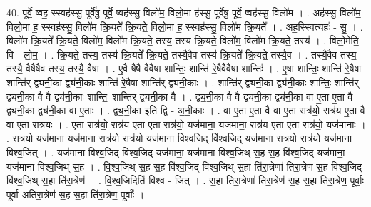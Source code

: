 \documentclass[17pt]{extarticle}
\begin{document}
40. पूर्वे॒ ष्वह॒ स्स्वह॑स्सु॒ पूर्वे॑षु॒ पूर्वे॒ ष्वह॑स्सु॒ विलो॑म॒ विलो॒मा ह॑स्सु॒ पूर्वे॑षु॒ पूर्वे॒ ष्वह॑स्सु॒ विलो॑म । . अह॑स्सु॒ विलो॑म॒ विलो॒मा ह॒ स्स्वह॑स्सु॒ विलो॑म क्रि॒यते᳚ क्रि॒यते॒ विलो॒मा ह॒ स्स्वह॑स्सु॒ विलो॑म क्रि॒यते᳚ । . अह॒स्स्वित्यहः॑ - सु॒ । . विलो॑म क्रि॒यते᳚ क्रि॒यते॒ विलो॑म॒ विलो॑म क्रि॒यते॒ तस्य॒ तस्य॑ क्रि॒यते॒ विलो॑म॒ विलो॑म क्रि॒यते॒ तस्य॑ । . विलो॒मेति॒ वि - लो॒म॒ । . क्रि॒यते॒ तस्य॒ तस्य॑ क्रि॒यते᳚ क्रि॒यते॒ तस्यै॒वैव तस्य॑ क्रि॒यते᳚ क्रि॒यते॒ तस्यै॒व । . तस्यै॒वैव तस्य॒ तस्यै॒ वैषैषैव तस्य॒ तस्यै॒ वैषा । . ए॒वै षैषै वैवैषा शान्तिः॒ शान्ति॑ रे॒षैवैवैषा शान्तिः॑ । . ए॒षा शान्तिः॒ शान्ति॑ रे॒षैषा शान्ति॑र् द्व्यनी॒का द्व्य॑नी॒काः शान्ति॑ रे॒षैषा शान्ति॑र् द्व्यनी॒काः । . शान्ति॑र् द्व्यनी॒का द्व्य॑नी॒काः शान्तिः॒ शान्ति॑र् द्व्यनी॒का वै वै द्व्य॑नी॒काः शान्तिः॒ शान्ति॑र् द्व्यनी॒का वै । . द्व्य॒नी॒का वै वै द्व्य॑नी॒का द्व्य॑नी॒का वा ए॒ता ए॒ता वै द्व्य॑नी॒का द्व्य॑नी॒का वा ए॒ताः । . द्व्य॒नी॒का इति॑ द्वि - अ॒नी॒काः । . वा ए॒ता ए॒ता वै वा ए॒ता रात्र॑यो॒ रात्र॑य ए॒ता वै वा ए॒ता रात्र॑यः । . ए॒ता रात्र॑यो॒ रात्र॑य ए॒ता ए॒ता रात्र॑यो॒ यज॑माना॒ यज॑माना॒ रात्र॑य ए॒ता ए॒ता रात्र॑यो॒ यज॑मानाः । . रात्र॑यो॒ यज॑माना॒ यज॑माना॒ रात्र॑यो॒ रात्र॑यो॒ यज॑माना विश्व॒जिद् वि॑श्व॒जिद् यज॑माना॒ रात्र॑यो॒ रात्र॑यो॒ यज॑माना विश्व॒जित् । . यज॑माना विश्व॒जिद् वि॑श्व॒जिद् यज॑माना॒ यज॑माना विश्व॒जिथ् स॒ह स॒ह वि॑श्व॒जिद् यज॑माना॒ यज॑माना विश्व॒जिथ् स॒ह । . वि॒श्व॒जिथ् स॒ह स॒ह वि॑श्व॒जिद् वि॑श्व॒जिथ् स॒हा ति॑रा॒त्रेणा॑ तिरा॒त्रेण॑ स॒ह वि॑श्व॒जिद् वि॑श्व॒जिथ् स॒हा ति॑रा॒त्रेण॑ । . वि॒श्व॒जिदिति॑ विश्व - जित् । . स॒हा ति॑रा॒त्रेणा॑ तिरा॒त्रेण॑ स॒ह स॒हा ति॑रा॒त्रेण॒ पूर्वाः॒ पूर्वा॑ अतिरा॒त्रेण॑ स॒ह स॒हा
ति॑रा॒त्रेण॒ पूर्वाः᳚ । \newline
\end{document}
